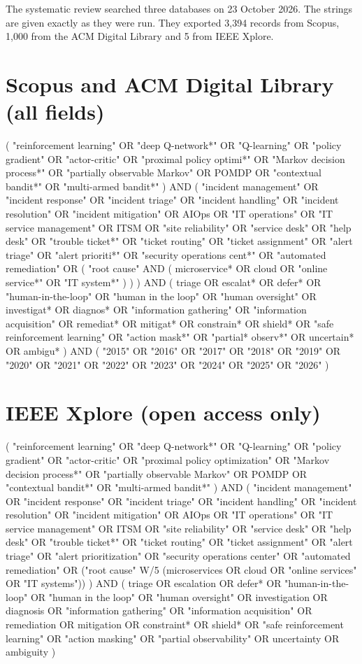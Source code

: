 The systematic review searched three databases on 23 October 2026. The strings are given exactly as they were run. They exported 3,394 records from Scopus, 1,000 from the ACM Digital Library and 5 from IEEE Xplore.

\section{Scopus and ACM Digital Library (all fields)}

{\footnotesize\ttfamily\raggedright
( "reinforcement learning" OR "deep Q-network*" OR "Q-learning" OR "policy gradient" OR "actor-critic" OR "proximal policy optimi*" OR "Markov decision process*" OR "partially observable Markov" OR POMDP OR "contextual bandit*" OR "multi-armed bandit*" ) AND ( "incident management" OR "incident response" OR "incident triage" OR "incident handling" OR "incident resolution" OR "incident mitigation" OR AIOps OR "IT operations" OR "IT service management" OR ITSM OR "site reliability" OR "service desk" OR "help desk" OR "trouble ticket*" OR "ticket routing" OR "ticket assignment" OR "alert triage" OR "alert prioriti*" OR "security operations cent*" OR "automated remediation" OR ( "root cause" AND ( microservice* OR cloud OR "online service*" OR "IT system*" ) ) ) AND ( triage OR escalat* OR defer* OR "human-in-the-loop" OR "human in the loop" OR "human oversight" OR investigat* OR diagnos* OR "information gathering" OR "information acquisition" OR remediat* OR mitigat* OR constrain* OR shield* OR "safe reinforcement learning" OR "action mask*" OR "partial* observ*" OR uncertain* OR ambigu* ) AND ( "2015" OR "2016" OR "2017" OR "2018" OR "2019" OR "2020" OR "2021" OR "2022" OR "2023" OR "2024" OR "2025" OR "2026" )\par}

\section{IEEE Xplore (open access only)}

{\footnotesize\ttfamily\raggedright
( "reinforcement learning" OR "deep Q-network*" OR "Q-learning" OR "policy gradient" OR "actor-critic" OR "proximal policy optimization" OR "Markov decision process*" OR "partially observable Markov" OR POMDP OR "contextual bandit*" OR "multi-armed bandit*" ) AND ( "incident management" OR "incident response" OR "incident triage" OR "incident handling" OR "incident resolution" OR "incident mitigation" OR AIOps OR "IT operations" OR "IT service management" OR ITSM OR "site reliability" OR "service desk" OR "help desk" OR "trouble ticket*" OR "ticket routing" OR "ticket assignment" OR "alert triage" OR "alert prioritization" OR "security operations center" OR "automated remediation" OR ("root cause" W/5 (microservices OR cloud OR "online services" OR "IT systems")) ) AND ( triage OR escalation OR defer* OR "human-in-the-loop" OR "human in the loop" OR "human oversight" OR investigation OR diagnosis OR "information gathering" OR "information acquisition" OR remediation OR mitigation OR constraint* OR shield* OR "safe reinforcement learning" OR "action masking" OR "partial observability" OR uncertainty OR ambiguity )\par}
